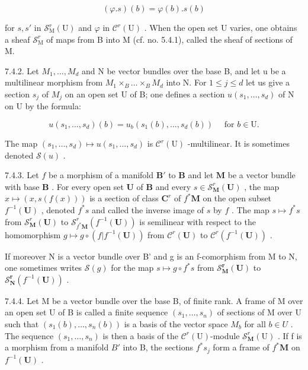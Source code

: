 \[
(\varphi . s) (b) = \varphi (b). s (b)
\]

for \(s, s'\) in \(\mathcal{S}_{\mathrm{M}}^{r}(\mathrm{U})\) and \(\varphi\) in \(\mathcal{C}^{r}(\mathrm{U})\) . When the open set U varies, one obtains a sheaf \(\mathcal{S}_{\mathrm{M}}^{r}\) of maps from B into M (cf. no. 5.4.1), called the sheaf of sections of M.

7.4.2. Let \(M_{1},\ldots,M_{d}\) and N be vector bundles over the base B, and let u be a multilinear morphism from \(M_{1}\times_{B}\ldots\times_{B}M_{d}\) into N. For \(1\leqslant j\leqslant d\) let us give a section \(s_{j}\) of \(M_{j}\) on an open set U of B; one defines a section \(u(s_{1},\ldots,s_{d})\) of N on U by the formula:

\[
u (s _ {1}, \dots , s _ {d}) (b) = u _ {b} (s _ {1} (b), \dots , s _ {d} (b)) \quad \text {   for   } b \in \mathrm{U}.
\]

The map \((s_1, \ldots, s_d) \mapsto u(s_1, \ldots, s_d)\) is \(\mathcal{C}^r(\mathrm{U})\) -multilinear. It is sometimes denoted \(\mathcal{S}(u)\) .

7.4.3. Let \(f\) be a morphism of a manifold \(\mathbf{B}'\) to \(\mathbf{B}\) and let \(\mathbf{M}\) be a vector bundle with base \(\mathbf{B}\) . For every open set \(\mathbf{U}\) of \(\mathbf{B}\) and every \(s \in \mathcal{S}_{\mathbf{M}}^{r}(\mathbf{U})\) , the map \(x \mapsto (x, s(f(x)))\) is a section of class \(\mathbf{C}^r\) of \(f^{*}\mathbf{M}\) on the open subset \(f^{-1}(\mathbf{U})\) , denoted \(f^{*}s\) and called the inverse image of \(s\) by \(f\) . The map \(s \mapsto f^{*}s\) from \(\mathcal{S}_{\mathbf{M}}^{r}(\mathbf{U})\) to \(\mathcal{S}_{f^{*}\mathbf{M}}^{r}(f^{-1}(\mathbf{U}))\) is semilinear with respect to the homomorphism \(g \mapsto g \circ (f|f^{-1}(\mathbf{U}))\) from \(\mathcal{C}^{r}(\mathbf{U})\) to \(\mathcal{C}^{r}(f^{-1}(\mathbf{U}))\) .

If moreover N is a vector bundle over B' and g is an f-comorphism from M to N, one sometimes writes \(\mathcal{S}(g)\) for the map \(s \mapsto g \circ f^{*}s\) from \(\mathcal{S}_{\mathbf{M}}^{\mathbf{r}}(\mathbf{U})\) to \(\mathcal{S}_{\mathbf{N}}^{\mathbf{r}}(f^{-1}(\mathbf{U}))\) .

7.4.4. Let M be a vector bundle over the base B, of finite rank. A frame of M over an open set U of B is called a finite sequence \((s_{1},\ldots,s_{n})\) of sections of M over U such that \((s_{1}(b),\ldots,s_{n}(b))\) is a basis of the vector space \(M_{b}\) for all \(b\in U\) . The sequence \((s_{1},\ldots,s_{n})\) is then a basis of the \(\mathcal{C}^{r}(\mathrm{U})\)-module \(\mathcal{S}_{\mathbf{M}}^{r}(\mathrm{U})\) . If f is a morphism from a manifold \(B'\) into B, the sections \(f^{*}s_{j}\) form a frame of \(f^{*}\mathbf{M}\) on \(f^{-1}(\mathbf{U})\) .

